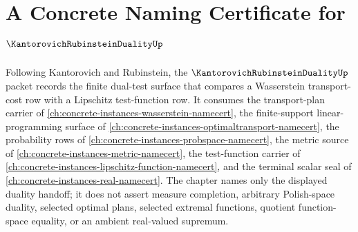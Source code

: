 \chapter{A Concrete Naming Certificate for $\KantorovichRubinsteinDualityUp$}
\label{ch:concrete-instances-kantorovich-rubinstein-duality-namecert}

Following Kantorovich and Rubinstein, the $\KantorovichRubinsteinDualityUp$ packet records the finite dual-test surface that compares a Wasserstein transport-cost row with a Lipschitz test-function row. It consumes the transport-plan carrier of \autoref{ch:concrete-instances-wasserstein-namecert}, the finite-support linear-programming surface of \autoref{ch:concrete-instances-optimaltransport-namecert}, the probability rows of \autoref{ch:concrete-instances-probspace-namecert}, the metric source of \autoref{ch:concrete-instances-metric-namecert}, the test-function carrier of \autoref{ch:concrete-instances-lipschitz-function-namecert}, and the terminal scalar seal of \autoref{ch:concrete-instances-real-namecert}. The chapter names only the displayed duality handoff; it does not assert measure completion, arbitrary Polish-space duality, selected optimal plans, selected extremal functions, quotient function-space equality, or an ambient real-valued supremum.

